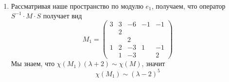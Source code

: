 \documentclass[12pt,a4paper]{article}
\begin{document}
\begin{problem*}
\begin{enumerate}
            \item Рассматривая наше пространство по модулю $e_1$, получаем, что оператор $S^{-1} \cdot M \cdot S$ получает вид
                \[
                    M_1 =
                    \begin{pmatrix}
                        3& 3& -6& -1& -1\\
                        & 2&&&\\
                        && 2&&\\
                        1& 2& -3& 1& -1\\
                        & 1& -3&&2 
                    \end{pmatrix}
                \]
                Мы знаем, что $\chi(M_1)(\lambda + 2) \sim \chi(M)$, значит
                \[\chi(M_1) \sim (\lambda - 2)^5\]


\end{enumerate}
\end{problem*}
\end{document}
